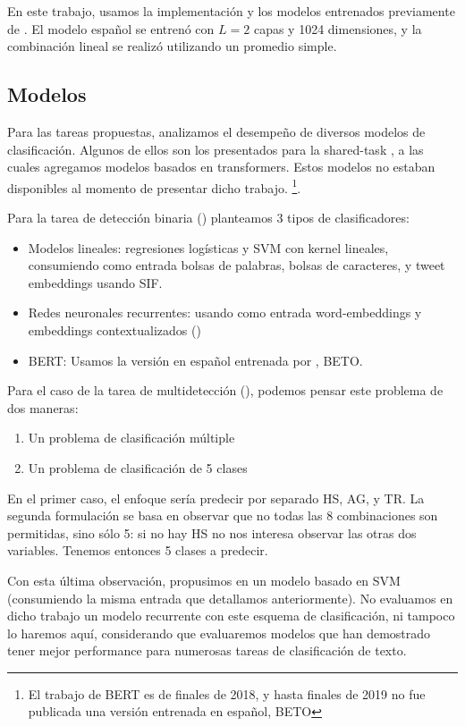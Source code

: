 En este trabajo, usamos la implementación y los modelos entrenados previamente de \cite{che-EtAl:2018:K18-2}. El modelo español se entrenó con $L = 2 $ capas y 1024 dimensiones, y la combinación lineal se realizó utilizando un promedio simple.

\subsection{Modelos}

Para las tareas propuestas, analizamos el desempeño de diversos modelos de clasificación. Algunos de ellos son los presentados para la shared-task \hateval{}, a las cuales agregamos modelos basados en transformers. Estos modelos no estaban disponibles al momento de presentar dicho trabajo. \footnote{El trabajo de BERT\cite{devlin2018bert} es de finales de 2018, y hasta finales de 2019 no fue publicada una versión entrenada en español, BETO}.

Para la tarea de detección binaria (\subtaska{}) planteamos 3 tipos de clasificadores:

\begin{itemize}
    \item Modelos lineales: regresiones logísticas y SVM con kernel lineales, consumiendo como entrada bolsas de palabras, bolsas de caracteres, y tweet embeddings usando SIF.
    \item Redes neuronales recurrentes: usando como entrada word-embeddings y embeddings contextualizados (\elmo{})
    \item BERT: Usamos la versión en español entrenada por \citet{canete2020spanish}, BETO.
\end{itemize}

Para el caso de la tarea de multidetección (\subtaskb{}), podemos pensar este problema de dos maneras:

\begin{enumerate}
    \item Un problema de clasificación múltiple
    \item Un problema de clasificación de 5 clases
\end{enumerate}

En el primer caso, el enfoque sería predecir por separado HS, AG, y TR. La segunda formulación se basa en observar que no todas las 8 combinaciones son permitidas, sino sólo 5: si no hay HS no nos interesa observar las otras dos variables. Tenemos entonces 5 clases a predecir.

Con esta última observación, propusimos en \citet{atalaya_tass2018} un modelo basado en SVM (consumiendo la misma entrada que detallamos anteriormente). No evaluamos en dicho trabajo un modelo recurrente con este esquema de clasificación, ni tampoco lo haremos aquí, considerando que evaluaremos modelos que han demostrado tener mejor performance para numerosas tareas de clasificación de texto.

